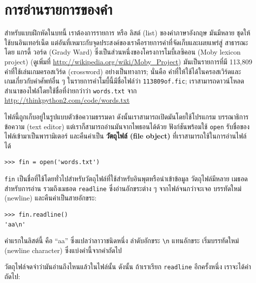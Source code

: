 \section{การอ่านรายการของคำ}%
\label{wordlist}

สำหรับแบบฝึกหัดในบทนี้ เราต้องการรายการ หรือ ลิสต์ (list) ของคำภาษาอังกฤษ มันมีหลาย
ชุดให้ใช้บนอินเทอร์เน็ต แต่อันที่เหมาะกับจุดประสงค์ของเราคือรายการคำที่จัดเก็บและเผยแพร่สู่
สาธารณะโดย แกรดี้ วอร์ด (Grady Ward) ซึ่งเป็นส่วนหนึ่งของโครงการโมบี้เลซิคอน (Moby lexicon project)
(ดูเพิ่มที่ \url{http://wikipedia.org/wiki/Moby_Project}) มันเป็นรายการที่มี 113,809 
คำที่ใช้เล่นเกมครอสเวิร์ด (crossword) อย่างเป็นทางการ; นั่นคือ คำที่ให้ใช้ได้ในครอสเวิร์ดและ
เกมเกี่ยวกับคำศัพท์อื่น ๆ  ในรายการคำโมบี้นี้มีชื่อไฟล์ว่า {\tt 113809of.fic}; เราสามารถดาวน์โหลด
สำเนาของไฟล์โดยใช้ชื่อที่ง่ายกว่าว่า {\tt words.txt} จาก \url{http://thinkpython2.com/code/words.txt}

ไฟล์นี้ถูกเก็บอยู่ในรูปแบบตัวข้อความธรรมดา ดังนั้นเราสามารถเปิดมันโดยใช้โปรแกรม
บรรณาธิการข้อความ (text editor) แต่เราก็สามารถอ่านมันจากไพธอนได้ด้วย
ฟังก์ชันพร้อมใช้ {\tt open} รับชื่อของไฟล์เข้ามาเป็นพารามิเตอร์ และคืนค่าเป็น 
{\bf วัตถุไฟล์ (file object)} ที่เราสามารถใช้ในการอ่านไฟล์ได้

\begin{verbatim}
>>> fin = open('words.txt')
\end{verbatim}
%
{\tt fin} เป็นชื่อที่ใช้โดยทั่วไปสำหรับวัตถุไฟล์ที่ใช้สำหรับอินพุตหรือนำเข้าข้อมูล วัตถุไฟล์มีหลาย
เมธอดสำหรับการอ่าน รวมถึงเมธอด {\tt readline} ซึ่งอ่านอักขระต่าง ๆ จากไฟล์จนกว่าจะเจอ
บรรทัดใหม่ (newline) และคืนค่าเป็นสายอักขระ:

\begin{verbatim}
>>> fin.readline()
'aa\n'
\end{verbatim}
%
คำแรกในลิสต์นี้ คือ ``aa'' ซึ่งแปลว่าลาวาชนิดหนึ่ง ลำดับอักขระ \verb"\n" แทนอักขระ
เริ่มบรรทัดใหม่ (newline character) ซึ่งแบ่งคำนี้จากคำถัดไป

วัตถุไฟล์จดจำว่ามันอ่านถึงไหนแล้วในไฟล์นั้น  ดังนั้น ถ้าเราเรียก {\tt readline} 
อีกครั้งหนึ่ง เราจะได้คำถัดไป:

